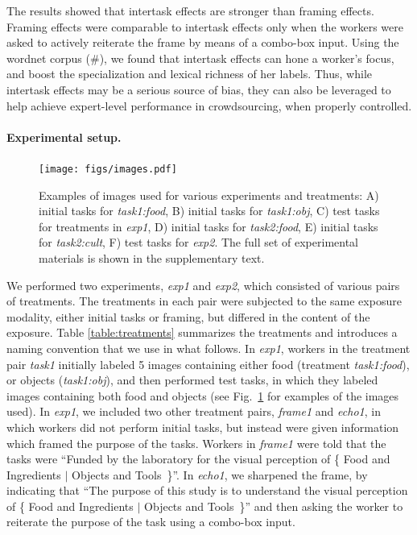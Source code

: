 \documentclass[12pt]{article}
\begin{document}
The results showed that intertask effects are stronger than framing effects.  
Framing effects were comparable to intertask effects only when the workers 
were asked to actively reiterate the frame by means of a combo-box input.
Using the wordnet corpus (\#), we found that intertask 
effects can hone a worker's focus, and boost the specialization
and lexical richness of her labels.  Thus, while intertask effects may be a 
serious source of bias, they can also be leveraged to help achieve
expert-level performance in crowdsourcing, when properly controlled.

\paragraph{Experimental setup.}
\begin{figure}
	\centering
	\texttt{[image: figs/images.pdf]}
	\caption{
		Examples of images used for various experiments and treatments:
		A) initial tasks for \textit{task1:food}, B) initial tasks for 
		\textit{task1:obj}, C) test tasks for treatments in \textit{exp1}, 
		D) initial tasks for \textit{task2:food}, 
		E) initial tasks for \textit{task2:cult},  
		F) test tasks for \textit{exp2}.  The full set of experimental 
		materials is shown in the supplementary text.
	}

	\label{fig:task}
\end{figure}

We performed two experiments, \textit{exp1} and \textit{exp2}, which consisted
of various pairs of treatments.  The treatments in each pair were subjected to
the same exposure modality, either initial tasks or framing, but differed in
the content of the exposure.  Table \ref{table:treatments}  
summarizes the treatments and introduces a naming convention that we use 
in what follows.
In \textit{exp1}, workers in the treatment pair \textit{task1} initially
labeled 5 images containing either food (treatment \textit{task1:food}), or 
objects (\textit{task1:obj}), and then performed test tasks, in 
which they 
labeled images containing both food and objects (see Fig.~\ref{fig:task} for 
examples of the images used). In \textit{exp1}, we included two other 
treatment pairs, \textit{frame1} and \textit{echo1}, in which workers did not 
perform initial tasks, but instead were given information which framed the 
purpose of the tasks.  Workers in \textit{frame1} were told that the tasks 
were ``Funded by the laboratory for the visual perception of 
\{ Food and Ingredients $\vert$ Objects and Tools~\}''.  In \textit{echo1},
we sharpened the frame, by indicating that ``The purpose of this study is to 
understand the visual perception of 
\{ Food and Ingredients $\vert$ Objects and Tools~\}'' and then asking the
worker to reiterate the purpose of the task using a combo-box input.
\end{document}
